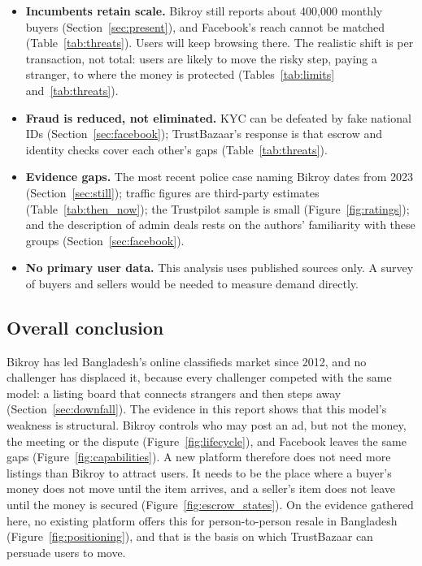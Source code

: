 \begin{itemize}
  \item \textbf{Incumbents retain scale.} Bikroy still reports about 400{,}000 monthly buyers
  (Section~\ref{sec:present}), and Facebook's reach cannot be matched (Table~\ref{tab:threats}).
  Users will keep browsing there. The realistic shift is per transaction, not total: users are
  likely to move the risky step, paying a stranger, to where the money is protected
  (Tables~\ref{tab:limits} and~\ref{tab:threats}).
  \item \textbf{Fraud is reduced, not eliminated.} KYC can be defeated by fake national IDs
  (Section~\ref{sec:facebook}); TrustBazaar's response is that escrow and identity checks cover
  each other's gaps (Table~\ref{tab:threats}).
  \item \textbf{Evidence gaps.} The most recent police case naming Bikroy dates from 2023
  (Section~\ref{sec:still}); traffic figures are third-party estimates (Table~\ref{tab:then_now});
  the Trustpilot sample is small (Figure~\ref{fig:ratings}); and the description of admin deals
  rests on the authors' familiarity with these groups (Section~\ref{sec:facebook}).
  \item \textbf{No primary user data.} This analysis uses published sources only. A survey of
  buyers and sellers would be needed to measure demand directly.
\end{itemize}

\subsection{Overall conclusion}

Bikroy has led Bangladesh's online classifieds market since 2012, and no challenger has displaced
it, because every challenger competed with the same model: a listing board that connects strangers
and then steps away (Section~\ref{sec:downfall}). The evidence in this report shows that this
model's weakness is structural. Bikroy controls who may post an ad, but not the money, the meeting
or the dispute (Figure~\ref{fig:lifecycle}), and Facebook leaves the same gaps
(Figure~\ref{fig:capabilities}). A new platform therefore does not need more listings than Bikroy
to attract users. It needs to be the place where a buyer's money does not move until the item
arrives, and a seller's item does not leave until the money is secured
(Figure~\ref{fig:escrow_states}). On the evidence gathered here, no existing platform offers this
for person-to-person resale in Bangladesh (Figure~\ref{fig:positioning}), and that is the basis on
which TrustBazaar can persuade users to move.
